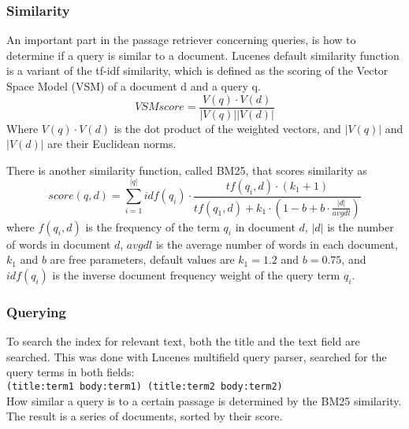 \subsubsection{Similarity}
An important part in the passage retriever concerning queries, is how to determine if a query is similar to a document.
Lucenes default similarity function is a variant of the tf-idf similarity, 
which is defined as the scoring of the Vector Space Model (VSM) of a document d and a query q.
\[VSM score = \frac{V(q)\cdot V(d)}{|V(q)||V(d)|} \]
Where $V(q) \cdot V(d)$ is the dot product of the weighted vectors, and $|V(q)|$ and $|V(d)|$ are their Euclidean norms. \cite{tfidfsimilarity}

There is another similarity function, called BM25, that scores similarity as
\[ score(q,d) = \sum_{i=1}^{|q|} idf(q_i) \cdot \frac{tf(q_i,d) \cdot (k_1 + 1)}{tf(q_1,d) + k_1 \cdot (1 - b + b \cdot \frac{|d|}{avgdl})} \]
where $f(q_i,d)$ is the frequency of the term $q_i$ in document $d$, 
$|d|$ is the number of words in document $d$,
$avgdl$ is the average number of words in each document,
$k_1$ and $b$ are free parameters, default values are $k_1 = 1.2$ and $b = 0.75$,
and $idf(q_i)$ is the inverse document frequency weight of the query term $q_i$. \cite{bm25similarity}

\subsubsection{Querying}
To search the index for relevant text, both the title and the text field are searched. 
This was done with Lucenes multifield query parser, searched for the query terms in both fields: \\
\texttt{(title:term1 body:term1) (title:term2 body:term2)} \\
How similar a query is to a certain passage is determined by the BM25 similarity.
The result is a series of documents, sorted by their score.
